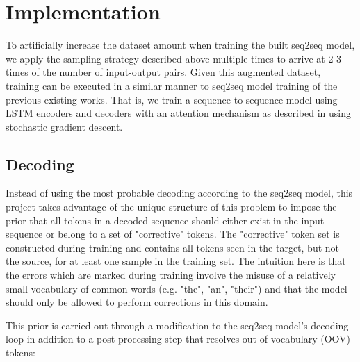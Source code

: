 \section{Implementation}
To artificially increase the dataset amount when training the built seq2seq model, we apply the sampling strategy described above multiple times to arrive at 2-3 times of the number of input-output pairs. Given this augmented dataset, training can be executed in a similar manner to seq2seq model training of the previous existing works. That is, we train a sequence-to-sequence model using LSTM encoders and decoders with an attention mechanism as described in \cite{bahdanau2014neural} using stochastic gradient descent.

\subsection{Decoding}

Instead of using the most probable decoding according to the seq2seq model, this project takes advantage of the unique structure of this problem to impose the prior that all tokens in a decoded sequence should either exist in the input sequence or belong to a set of "corrective" tokens. The "corrective" token set is constructed during training and contains all tokens seen in the target, but not the source, for at least one sample in the training set. The intuition here is that the errors which are marked during training involve the misuse of a relatively small vocabulary of common words (e.g. "the", "an", "their") and that the model should only be allowed to perform corrections in this domain.

This prior is carried out through a modification to the seq2seq model's decoding loop in addition to a post-processing step that resolves out-of-vocabulary (OOV) tokens:

